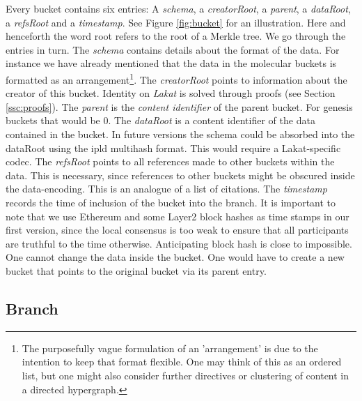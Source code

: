 Every bucket contains six entries: A \textit{schema}, a \textit{creatorRoot}, a \textit{parent}, a \textit{dataRoot}, a \textit{refsRoot} and a \textit{timestamp}. See Figure \ref{fig:bucket} for an illustration. Here and henceforth the word root refers to the root of a Merkle tree. We go through the entries in turn. The \textit{schema} contains details about the format of the data. For instance we have already mentioned that the data in the molecular buckets is formatted as an arrangement\footnote{The purposefully vague formulation of an 'arrangement' is due to the intention to keep that format flexible. One may think of this as an ordered list, but one might also consider further directives or clustering of content in a directed hypergraph.}. The \textit{creatorRoot} points to information about the creator of this bucket. Identity on \textit{Lakat} is solved through proofs (see Section \ref{ssc:proofs}). The \textit{parent} is the \textit{content identifier} of the parent bucket. For genesis buckets that would be 0. The \textit{dataRoot} is a content identifier of the data contained in the bucket. In future versions the schema could be absorbed into the dataRoot using the ipld multihash format. This would require a Lakat-specific codec. The \textit{refsRoot} points to all references made to other buckets within the data. This is necessary, since references to other buckets might be obscured inside the data-encoding. This is an analogue of a list of citations. The \textit{timestamp} records the time of inclusion of the bucket into the branch. It is important to note that we use Ethereum \cite{buterin2013ethereum} and some Layer2 block hashes as time stamps in our first version, since the local consensus is too weak to ensure that all participants are truthful to the time otherwise. Anticipating block hash is close to impossible. One cannot change the data inside the bucket. One would have to create a new bucket that points to the original bucket via its parent entry. 




\subsection{Branch}
\label{ssc:branch}

